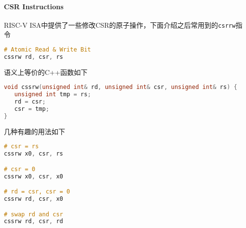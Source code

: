 \paragraph{CSR Instructions}\label{csr-instructions}

RISC-V
ISA中提供了一些修改CSR的原子操作，下面介绍之后常用到的\texttt{csrrw}指令

\begin{lstlisting}[language={C}]
# Atomic Read & Write Bit
cssrw rd, csr, rs
\end{lstlisting}

语义上等价的C++函数如下

\begin{lstlisting}[language={C}]
void cssrw(unsigned int& rd, unsigned int& csr, unsigned int& rs) {
   unsigned int tmp = rs;
   rd = csr;
   csr = tmp;
}
\end{lstlisting}

几种有趣的用法如下

\begin{lstlisting}[language={C}]
# csr = rs
cssrw x0, csr, rs

# csr = 0
cssrw x0, csr, x0

# rd = csr, csr = 0
cssrw rd, csr, x0

# swap rd and csr
cssrw rd, csr, rd
\end{lstlisting}
